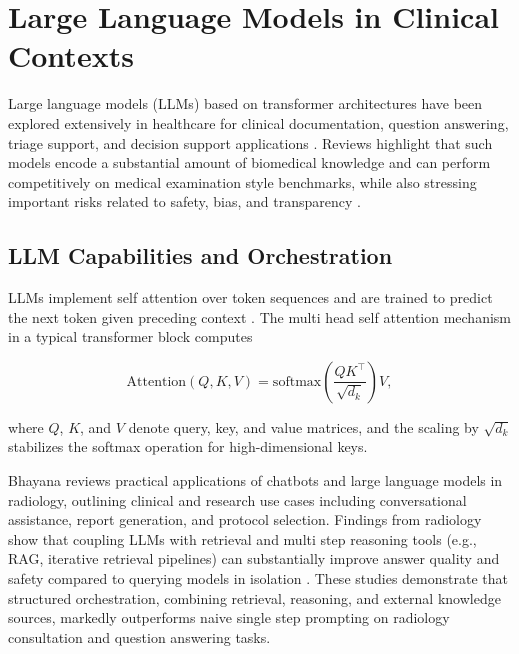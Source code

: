 \documentclass[12pt,a4paper]{report}
\begin{document}
	
	\section{Large Language Models in Clinical Contexts}
	\label{sec:llms}
	
	Large language models (LLMs) based on transformer architectures have been
	explored extensively in healthcare for clinical documentation, question
	answering, triage support, and decision support applications
	\cite{thirunavukarasu2023large}. Reviews highlight that such models encode a
	substantial amount of biomedical knowledge and can perform competitively on
	medical examination style benchmarks, while also stressing important risks
	related to safety, bias, and transparency \cite{thirunavukarasu2023large}.
	
	\subsection{LLM Capabilities and Orchestration}
	
	LLMs implement self attention over token sequences and are trained to predict
	the next token given preceding context \cite{thirunavukarasu2023large}. The
	multi head self attention mechanism in a typical transformer block computes
	
	\begin{equation}
		\mathrm{Attention}(Q, K, V)
		= \mathrm{softmax}\!\left(\frac{QK^\top}{\sqrt{d_k}}\right)V,
	\end{equation}
	
	where $Q$, $K$, and $V$ denote query, key, and value matrices, and the scaling
	by $\sqrt{d_k}$ stabilizes the softmax operation for high-dimensional keys.
	
	Bhayana  
	\cite{chatbots_Rajesh_2024} reviews practical applications of
	chatbots and large language models in radiology, outlining clinical and research
	use cases including conversational assistance, report generation, and protocol
	selection. Findings from radiology show that coupling LLMs with retrieval and
	multi step reasoning tools (e.g., RAG, iterative retrieval pipelines) can
	substantially improve answer quality and safety compared to querying models in
	isolation \cite{Wada2025RAGRadiology,Wind2025RaRRadiology}. These studies
	demonstrate that structured orchestration, combining retrieval, reasoning, and
	external knowledge sources, markedly outperforms naive single step prompting on
	radiology consultation and question answering tasks.
	
\end{document}
